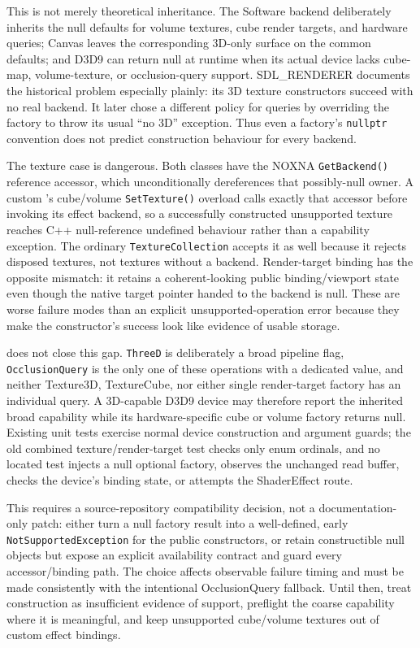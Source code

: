 This is not merely theoretical inheritance. The Software backend deliberately inherits the
null defaults for volume textures, cube render targets, and hardware queries; Canvas leaves
the corresponding 3D-only surface on the common defaults; and D3D9 can return null at runtime
when its actual device lacks cube-map, volume-texture, or occlusion-query support. SDL\_RENDERER
documents the historical problem especially plainly: its 3D texture constructors succeed with
no real backend. It later chose a different policy for queries by overriding the factory to
throw its usual ``no 3D'' exception. Thus even a factory's \texttt{nullptr} convention does not
predict construction behaviour for every backend.

The texture case is dangerous. Both classes have the NOXNA
\texttt{GetBackend\allowbreak()} reference accessor, which unconditionally dereferences that possibly-null
owner. A custom 's cube/volume \texttt{SetTexture()} overload calls exactly
that accessor before invoking its effect backend, so a successfully constructed unsupported
texture reaches C++ null-reference undefined behaviour rather than a capability exception. The
ordinary \texttt{Texture\allowbreak Collection} accepts it as well because it rejects disposed textures,
not textures without a backend. Render-target binding has the opposite mismatch: it retains a
coherent-looking public binding/viewport state even though the native target pointer handed to
the backend is null. These are worse failure modes than an explicit unsupported-operation error
because they make the constructor's success look like evidence of usable storage.

 does not close this gap. \texttt{ThreeD} is deliberately a broad
pipeline flag, \texttt{OcclusionQuery} is the only one of these operations with a dedicated
value, and neither Texture3D, TextureCube, nor either single render-target factory has an
individual query. A 3D-capable D3D9 device may therefore report the inherited broad capability
while its hardware-specific cube or volume factory returns null. Existing unit tests exercise
normal device construction and argument guards; the old combined texture/render-target test
checks only enum ordinals, and no located test injects a null optional factory, observes the
unchanged read buffer, checks the device's binding state, or attempts the ShaderEffect route.

This requires a source-repository compatibility decision, not a documentation-only patch:
either turn a null factory result into a well-defined, early \texttt{NotSupportedException}
for the public constructors, or retain constructible null objects but expose an explicit
availability contract and guard every accessor/binding path. The choice affects observable
failure timing and must be made consistently with the intentional OcclusionQuery fallback.
Until then, treat construction as insufficient evidence of support, preflight the coarse
capability where it is meaningful, and keep unsupported cube/volume textures out of custom
effect bindings.

